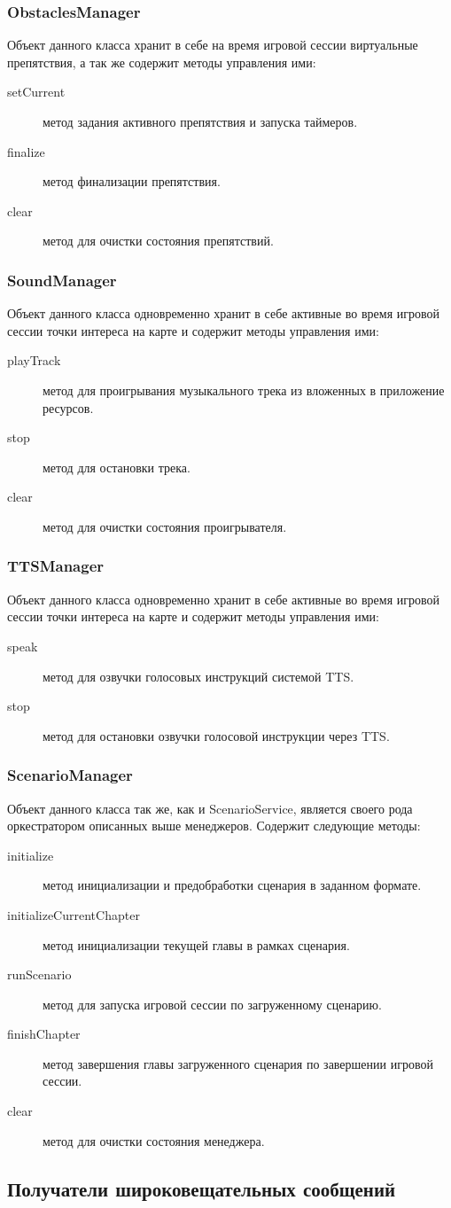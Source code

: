 \subsubsection*{ObstaclesManager}
Объект данного класса хранит в себе на время игровой сессии виртуальные препятствия, а так же содержит методы управления ими:
\begin{description}
	\item[setCurrent] метод задания активного препятствия и запуска таймеров.
	\item[finalize] метод финализации препятствия.
	\item[clear] метод для очистки состояния препятствий.
\end{description}

\subsubsection*{SoundManager}
Объект данного класса одновременно хранит в себе активные во время игровой сессии точки интереса на карте и содержит методы управления ими:
\begin{description}
	\item[playTrack] метод для проигрывания музыкального трека из вложенных в приложение ресурсов.
	\item[stop] метод для остановки трека.
	\item[clear] метод для очистки состояния проигрывателя.
\end{description}

\subsubsection*{TTSManager}
Объект данного класса одновременно хранит в себе активные во время игровой сессии точки интереса на карте и содержит методы управления ими:
\begin{description}
	\item[speak] метод для озвучки голосовых инструкций системой TTS.
	\item[stop] метод для остановки озвучки голосовой инструкции через TTS.
\end{description}

\subsubsection*{ScenarioManager}
Объект данного класса так же, как и ScenarioService, является своего рода оркестратором описанных выше менеджеров. 
Содержит следующие методы:
\begin{description}
	\item[initialize] метод инициализации и предобработки сценария в заданном формате.
	\item[initializeCurrentChapter] метод инициализации текущей главы в рамках сценария.
	\item[runScenario] метод для запуска игровой сессии по загруженному сценарию.
	\item[finishChapter] метод завершения главы загруженного сценария по завершении игровой сессии.
	\item[clear] метод для очистки состояния менеджера.
\end{description}

\subsection{Получатели широковещательных сообщений}